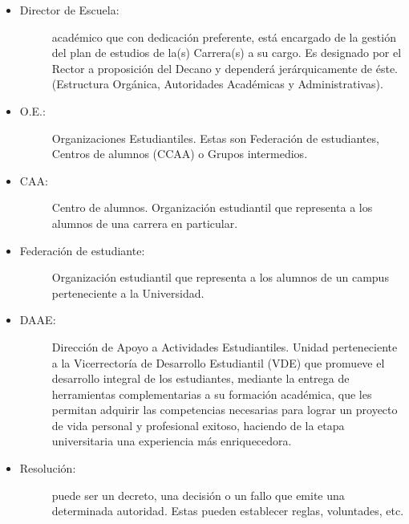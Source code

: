 \begin{itemize}
	\item 	\begin{description}
			    \item[Director de Escuela:] académico que con dedicación preferente, está encargado de la gestión del plan de estudios de la(s) Carrera(s) a su cargo. Es designado por el Rector a proposición del Decano y dependerá jerárquicamente de éste. (Estructura Orgánica, Autoridades Académicas y Administrativas). \cite{1}
			\end{description}

	\item 	\begin{description}
			    \item[O.E.:] Organizaciones Estudiantiles. Estas son Federación de estudiantes, Centros de alumnos (CCAA) o Grupos intermedios. \cite{2}
			\end{description}

	\item 	\begin{description}
			    \item[CAA:] Centro de alumnos. Organización estudiantil que representa a los alumnos de una carrera en particular. \cite{3}
			\end{description}

	\item 	\begin{description}
			    \item[Federación de estudiante:] Organización estudiantil que representa a los alumnos de un campus perteneciente a la Universidad. \cite{2}
			\end{description}

	\item 	\begin{description}
			    \item[DAAE:] Dirección de Apoyo a Actividades Estudiantiles. Unidad perteneciente a la Vicerrectoría de Desarrollo Estudiantil (VDE) que promueve el desarrollo integral de los estudiantes, mediante la entrega de herramientas complementarias a su formación académica, que les permitan adquirir las competencias necesarias para lograr un proyecto de vida personal y profesional exitoso, haciendo de la etapa universitaria una experiencia más enriquecedora. \cite{1}
			\end{description}

	\item 	\begin{description}
			    \item[Resolución:] puede ser un decreto, una decisión o un fallo que emite una determinada autoridad. Estas pueden establecer reglas, voluntades, etc.
			\end{description}


\end{itemize}

